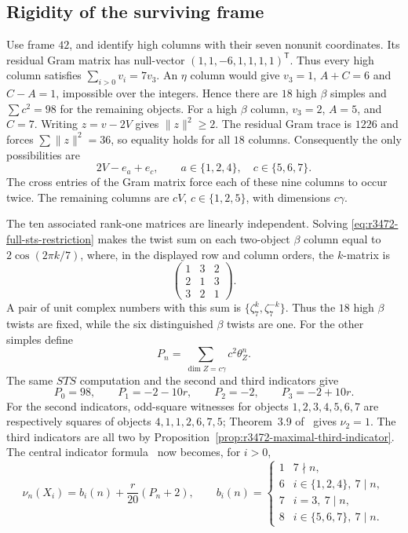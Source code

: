 \subsection{Rigidity of the surviving frame}
Use frame $42$, and identify high columns with their seven nonunit
coordinates. Its residual Gram matrix has null-vector
$(1,1,-6,1,1,1,1)^{\mathsf T}$. Thus every high column satisfies
$\sum_{i>0}v_i=7v_3$. An $\eta$ column would give $v_3=1$,
$A+C=6$ and $C-A=1$, impossible over the integers. Hence there are
$18$ high $\beta$ simples and $\sum c^2=98$ for the remaining objects.
For a high $\beta$ column, $v_3=2$, $A=5$, and $C=7$.
Writing $z=v-2V$ gives $\|z\|^2\geq2$. The residual Gram trace is
$1226$ and forces $\sum\|z\|^2=36$, so equality holds for all
$18$ columns. Consequently the only possibilities are
\[
 2V-e_a+e_c,\qquad a\in\{1,2,4\},\quad c\in\{5,6,7\}.
\]
The cross entries of the Gram matrix force each of these nine columns to
occur twice. The remaining columns are $cV$, $c\in\{1,2,5\}$,
with dimensions $c\gamma$.

The ten associated rank-one matrices are linearly independent.
Solving \eqref{eq:r3472-full-sts-restriction} makes the twist sum on
each two-object $\beta$ column equal to $2\cos(2\pi k/7)$, where,
in the displayed row and column orders, the $k$-matrix is
\[
 \begin{pmatrix}1&3&2\\2&1&3\\3&2&1\end{pmatrix}.
\]
A pair of unit complex numbers with this sum is
$\{\zeta_7^k,\zeta_7^{-k}\}$. Thus the $18$ high $\beta$ twists
are fixed, while the six distinguished $\beta$ twists are one.
For the other simples define
\[
 P_n=\sum_{\dim Z=c\gamma}c^2\theta_Z^n.
\]
The same $STS$ computation and the second and third indicators give
\begin{equation}\label{eq:r3472-first-three-moments}
 P_0=98,\qquad P_1=-2-10r,\qquad P_2=-2,\qquad P_3=-2+10r.
\end{equation}
For the second indicators, odd-square witnesses for objects
$1,2,3,4,5,6,7$ are respectively squares of objects
$4,1,1,2,6,7,5$; Theorem~3.9 of~\cite{LPRV} gives $\nu_2=1$.
The third indicators are all two by
Proposition~\ref{prop:r3472-maximal-third-indicator}.
The central indicator formula~\cite{NgIndicators} now becomes, for
$i>0$,
\begin{equation}\label{eq:r3472-indicator-moments}
 \nu_n(X_i)=b_i(n)+\frac{r}{20}(P_n+2),\qquad
 b_i(n)=\begin{cases}
 1&7\nmid n,\\
 6&i\in\{1,2,4\},\ 7\mid n,\\
 7&i=3,\ 7\mid n,\\
 8&i\in\{5,6,7\},\ 7\mid n.
 \end{cases}
\end{equation}


